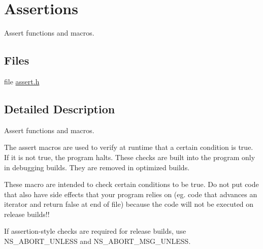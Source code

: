 \hypertarget{group__assert}{}\section{Assertions}
\label{group__assert}


Assert functions and macros.  


\subsection*{Files}
\begin{DoxyCompactItemize}
\item 
file \hyperlink{assert_8h}{assert.\+h}
\end{DoxyCompactItemize}


\subsection{Detailed Description}
Assert functions and macros. 

The assert macros are used to verify at runtime that a certain condition is true. If it is not true, the program halts. These checks are built into the program only in debugging builds. They are removed in optimized builds.

These macro are intended to check certain conditions to be true. Do not put code that also have side effects that your program relies on (eg. code that advances an iterator and return false at end of file) because the code will not be executed on release builds!!

If assertion-\/style checks are required for release builds, use N\+S\+\_\+\+A\+B\+O\+R\+T\+\_\+\+U\+N\+L\+E\+SS and N\+S\+\_\+\+A\+B\+O\+R\+T\+\_\+\+M\+S\+G\+\_\+\+U\+N\+L\+E\+SS. 